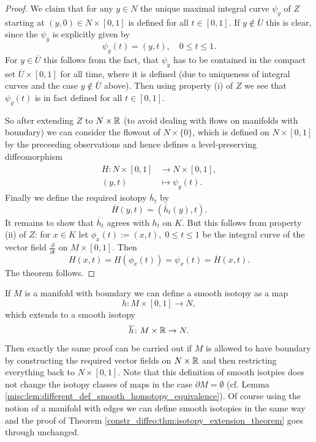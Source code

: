 \begin{proof}
    We claim that for any $y \in N$ the unique maximal integral curve $\psi_y$ of $Z$ starting at $(y,0) \in N \times [0,1]$ is defined for all $t \in [0,1]$. If $y \notin \overline{U}$ this is clear, since the $\psi_y$ is explicitly given by 
    \[
    \psi_y(t) = (y,t), \quad 0 \leq t \leq 1.
    \] 
    For $y \in \overline{U}$ this follows from the fact, that $\psi_y$ has to be contained in the compact set $\overline{U} \times [0,1]$ for all time, where it is defined (due to uniqueness of integral curves and the case $y \notin \overline{U}$ above). Then using property (i) of $Z$ we see that $\psi_y(t)$ is in fact defined for all $t \in [0,1]$. 
    
    So after extending $Z$ to $N \times \mathbb{R}$ (to avoid dealing with flows on manifolds with boundary) we can consider the flowout of $N \times \{0\}$, which is defined on $N \times [0,1]$ by the preceeding observations and hence defines a level-preserving diffeomorphism 
    \begin{align*}
        \overline{H} \colon N \times [0,1] &\to N \times [0,1], \\
                (y,t) & \mapsto \psi_y(t).
    \end{align*}
    Finally we define the required isotopy $\overline{h}_t$ by 
    \[
    \overline{H}(y,t) = (\overline{h}_t(y),t).
    \]
    It remains to show that $\overline{h}_t$ agrees with $h_t$ on $K$. But this follows from property (ii) of $Z$: for $x \in K$ let $\phi_x(t) := (x,t), \; 0 \leq t \leq 1$ be the integral curve of the vector field $\frac{\partial}{\partial t}$ on $M \times [0,1]$. Then 
    \[
    H(x,t) = H(\phi_x(t)) = \psi_x(t) = \overline{H}(x,t).
    \]
    The theorem follows.
\end{proof}

\begin{remark}
    \label{constr_diffeo:rem:isotopy_extension_thm_boundary}
    If $M$ is a manifold with boundary we can define a smooth isotopy as a map 
    \[
    h \colon M \times [0,1] \to N,
    \]
    which extends to a smooth isotopy
    \[
    \overline{h} \colon M \times \mathbb{R} \to N.
    \]
    Then exactly the same proof can be carried out if $M$ is allowed to have boundary by constructing the required vector fields on $N \times \mathbb{R}$ and then restricting everything back to $N \times [0,1]$. Note that this definition of smooth isotpies does not change the isotopy classes of maps in the case $\partial M = \emptyset$ (cf. Lemma \ref{misc:lem:different_def_smooth_homotopy_equivalence}). Of course using the notion of a manifold with edges we can define smooth isotopies in the same way and the proof of Theorem \ref{constr_diffeo:thm:isotopy_extension_theorem} goes through unchanged.
\end{remark}

